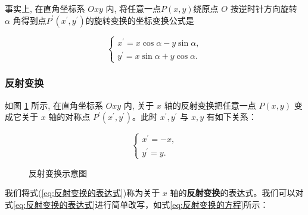 \documentclass[lang=cn,newtx,10pt,scheme=chinese]{elegantbook}
\begin{document}
事实上, 在直角坐标系 $O x y$ 内, 将任意一点$P(x, y)$绕原点 $O$ 按逆时针方向旋转 $\alpha$ 角得到点$P^{\prime}(x^{\prime}, y^{\prime})$的旋转变换的坐标变换公式是

\begin{equation}
\left\{\begin{array}{l}
x^{\prime}=x \cos \alpha-y \sin \alpha, \\
y^{\prime}=x \sin \alpha+y \cos \alpha .
\end{array}\right.    
\end{equation}

\subsubsection{反射变换}
\label{subsubsec:反射变换}

如图 \ref{fig:反射变换} 所示, 在直角坐标系 $O x y$ 内, 关于 $x$ 轴的反射变换把任意一点 $P(x, y)$ 变成它关于 $x$ 轴的对称点 $P^{\prime}\left(x^{\prime}, y^{\prime}\right)$。此时 $x^{\prime}, y^{\prime}$ 与 $x, y$ 有如下关系：

\begin{equation}
\left\{\begin{array}{l}
x^{\prime}=-x, \\
y^{\prime}=y .
\end{array}\right.
\label{eq:反射变换的表达式}
\end{equation}

\begin{figure}[h]
\centering
{}
\caption{反射变换示意图\label{fig:反射变换}}
\end{figure}

我们将式(\ref{eq:反射变换的表达式})称为关于 $x$ 轴的\textcolor{third}{\bf 反射变换}的表达式。我们可以对式\ref{eq:反射变换的表达式}进行简单改写，如式\ref{eq:反射变换的方程}所示：
\end{document}
